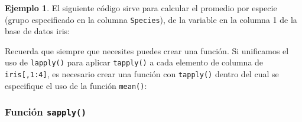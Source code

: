 \documentclass[
]{article}
\newenvironment{Shaded}{\begin{snugshade}}{\end{snugshade}}
\newcommand{\AttributeTok}[1]{\textcolor[rgb]{0.77,0.63,0.00}{#1}}
\newcommand{\CommentTok}[1]{\textcolor[rgb]{0.56,0.35,0.01}{\textit{#1}}}
\newcommand{\ControlFlowTok}[1]{\textcolor[rgb]{0.13,0.29,0.53}{\textbf{#1}}}
\newcommand{\DecValTok}[1]{\textcolor[rgb]{0.00,0.00,0.81}{#1}}
\newcommand{\FunctionTok}[1]{\textcolor[rgb]{0.00,0.00,0.00}{#1}}
\newcommand{\NormalTok}[1]{#1}
\newcommand{\SpecialCharTok}[1]{\textcolor[rgb]{0.00,0.00,0.00}{#1}}
\theoremstyle{definition}
\theoremstyle{definition}
\newtheorem{example}{Ejemplo}[section]
\theoremstyle{definition}
\theoremstyle{definition}
\theoremstyle{remark}
\begin{document}
\begin{example}

El siguiente código sirve para calcular el promedio por especie (grupo especificado en la columna \texttt{Species}), de la variable en la columna 1 de la base de datos iris:

\begin{Shaded}
\end{Shaded}

\end{example}

Recuerda que siempre que necesites puedes crear una función. Si unificamos el uso de \texttt{lapply()} para aplicar \texttt{tapply()} a cada elemento de columna de \texttt{iris{[},1:4{]}}, es necesario crear una función con \texttt{tapply()} dentro del cual se especifique el uso de la función \texttt{mean()}:

\begin{Shaded}
\end{Shaded}

\hypertarget{funciuxf3n-sapply}{%
\subsubsection{\texorpdfstring{Función \texttt{sapply()}}{Función sapply()}}\label{funciuxf3n-sapply}}
\end{document}
